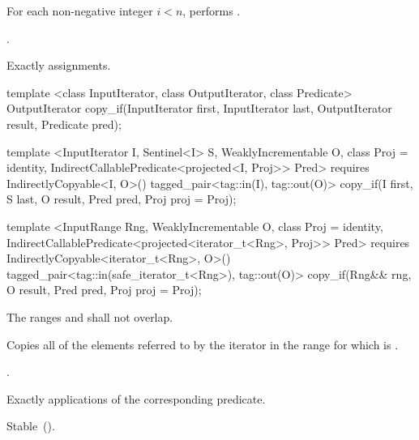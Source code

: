 \begin{itemdescr}
\pnum
\effects For each non-negative integer
$i < n$, performs .

\pnum
\returns {}.

\pnum
\complexity Exactly  assignments.
\end{itemdescr}

%
\begin{removedblock}
\begin{itemdecl}
template <class InputIterator, class OutputIterator, class Predicate>
  OutputIterator copy_if(InputIterator first, InputIterator last,
                         OutputIterator result, Predicate pred);
\end{itemdecl}
\end{removedblock}
\begin{addedblock}
\begin{itemdecl}
template <InputIterator I, Sentinel<I> S, WeaklyIncrementable O, class Proj = identity,
    IndirectCallablePredicate<projected<I, Proj>> Pred>
  requires IndirectlyCopyable<I, O>()
  tagged_pair<tag::in(I), tag::out(O)>
    copy_if(I first, S last, O result, Pred pred, Proj proj = Proj{});

template <InputRange Rng, WeaklyIncrementable O, class Proj = identity,
    IndirectCallablePredicate<projected<iterator_t<Rng>, Proj>> Pred>
  requires IndirectlyCopyable<iterator_t<Rng>, O>()
  tagged_pair<tag::in(safe_iterator_t<Rng>), tag::out(O)>
    copy_if(Rng&& rng, O result, Pred pred, Proj proj = Proj{});
\end{itemdecl}
\end{addedblock}

\begin{itemdescr}
\pnum
\requires The ranges  and  shall not overlap.

\pnum
\effects Copies all of the elements referred to by the iterator  in the range 
for which  is .

\pnum
\returns {}.

\pnum
\complexity Exactly  applications of the corresponding predicate.

\pnum
\remarks Stable~().
\end{itemdescr}


